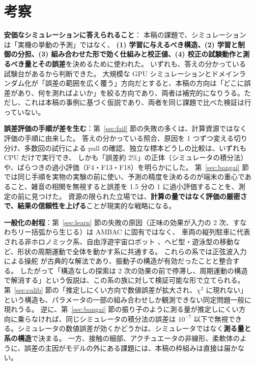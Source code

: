 \documentclass[paper=a4paper,fontsize=10pt,twocolumn,column_gap=2zw,line_length=24zw,number_of_lines=46,head_space=20mm]{jlreq}
\begin{document}
\section{考察}\label{sec:discuss}

\textbf{安価なシミュレーションに答えられること}：
本稿の課題で、シミュレーションは「実機の挙動の予測」ではなく、
\textbf{(1) 学習に与えるべき構造、(2) 学習と制御の分担、(3) 組み合わせた形で効く仕組みと校正値、(4) 校正の試験動作と測るべき量とその誤差}を決めるために使われた。
いずれも、答えの分かっている試験台があるから判断できた。
大規模な GPU シミュレーションとドメインランダム化が「誤差の範囲を広く覆う」方向だとすると、本稿の方向は「どこに誤差があり、何を測ればよいか」を絞る方向であり、両者は補完的になりうる。ただし、これは本稿の事例に基づく仮説であり、両者を同じ課題で比べた検証は行っていない。

\textbf{誤差評価の手順が差を生む}：第~\ref{sec:fail} 節の失敗の多くは、計算資源ではなく評価の手順に由来した。
答えの分かっている照合、原因を 1 つずつ変える切り分け、多数回の試行による pull の確認、独立な標本どうしの比較は、いずれも CPU だけで実行でき、
しかも「誤差約 2\%」の正体（シミュレータの積分法）や、ばらつきの過小評価（F4・F13・F18）を明らかにした。
第~\ref{sec:bangai} 節では同じ手順を実物の実験の前に使い、予測の精度を決めるのが端末の重心であること、雑音の相関を無視すると誤差を 1.5 分の 1 に過小評価することを、測定の前に見つけた。
資源の限られた立場では、\textbf{計算の量ではなく評価の厳密さで、結果の信頼性を上げる}ことが現実的な戦略になる。

\textbf{一般化の射程}：第~\ref{sec:learn} 節の失敗の原因（正味の効果が入力の 2 次、すなわちリー括弧から生じる）は AMBAC に固有ではなく、
車両の縦列駐車に代表される非ホロノミック系、自由浮遊宇宙ロボット \cite{nakamura1991}、ヘビ型・遊泳型の移動など、形状の周期運動で全体を動かす系に共通する。
これらの系では正弦波入力による操舵 \cite{murray1993} が古典的な解法であり、振動子の構造が有効だったことと整合する。
したがって「構造なしの探索は 2 次の効果の前で停滞し、周期運動の構造で解消する」という仮説は、この系の族に対して検証可能な形で立てられる。
第~\ref{sec:calib} 節の「推定しにくい方向で数値誤差が拡大され、$\chi^2$ に現れない」という構造も、パラメータの一部の組み合わせしか観測できない同定問題一般に現れうる。
逆に、第~\ref{sec:bangai} 節の振り子のように測る量が推定しにくい方向に乗らなければ、同じシミュレータの積分法の誤差は $10^{-7}$ 以下で無視できる。シミュレータの数値誤差が効くかどうかは、シミュレータではなく\textbf{測る量と系の構造}で決まる。
一方、接触の細部、アクチュエータの非線形、柔軟体のように、誤差の主因がモデルの外にある課題には、本稿の枠組みは直接は届かない。
\end{document}
